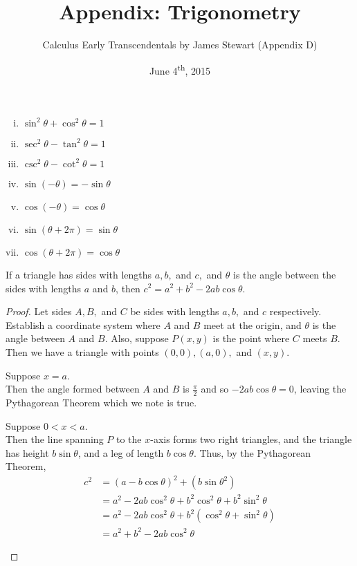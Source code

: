 \documentclass[a4paper,8pt]{article}
\title{Appendix: Trigonometry}
\author{Calculus Early Transcendentals by James Stewart (Appendix D)}
\date{June 4\textsuperscript{th}, 2015}
\begin{document}
\maketitle
{}

\begin{outline}

    \begin{enumerate}[i.]
      \item \(\sin^2\theta + \cos^2\theta = 1\)
      \item \(\sec^2\theta - \tan^2\theta = 1\)
      \item \(\csc^2\theta - \cot^2\theta = 1\)
      \item \(\sin{(-\theta)} = -\sin{\theta}\)
      \item \(\cos{(-\theta)} = \cos{\theta}\)
      \item \(\sin{(\theta + 2\pi)} = \sin{\theta}\)
      \item \(\cos{(\theta + 2\pi)} = \cos{\theta}\)
    \end{enumerate}

    If a triangle has sides with lengths \(a, b,\) and \(c,\) and \(\theta\) is the angle between the sides
    with lengths \(a\) and \(b\), then \(c^2 = a^2 + b^2 - 2ab\cos{\theta}\).

    \begin{proof}
      Let sides \(A, B,\) and \(C\) be sides with lengths \(a, b,\) and \(c\) respectively. Establish a coordinate
      system where \(A\) and \(B\) meet at the origin, and \(\theta\) is the angle between \(A\) and \(B\). Also,
      suppose \(P(x, y)\) is the point where \(C\) meets \(B\). Then we have a triangle with points \((0, 0), (a, 0),\)
      and \((x, y)\).

      \begin{proofcases}
        \item
          Suppose \(x = a\).\\
          Then the angle formed between \(A\) and \(B\) is \(\frac{\pi}{2}\) and so \(-2ab\cos{\theta} = 0\),
          leaving the Pythagorean Theorem which we note is true.
        \item
          Suppose \(0 < x < a\).\\
          Then the line spanning \(P\) to the \(x\)-axis forms two right triangles, and the triangle has height
          \(b\sin{\theta}\), and a leg of length \(b\cos{\theta}\). Thus, by the Pythagorean Theorem,
          \begin{align*}
            c^2 &= (a-b\cos{\theta})^2 + (b\sin{\theta}^2) \\
                &= a^2 - 2ab\cos^2{\theta} + b^2\cos^2{\theta} + b^2\sin^2{\theta}\\
                &= a^2 - 2ab\cos^2{\theta} + b^2(\cos^2{\theta} + \sin^2{\theta}) \\
                &= a^2 + b^2 - 2ab\cos^2{\theta}
          \end{align*}
      \end{proofcases}
    \end{proof}


\end{outline}
\end{document}
